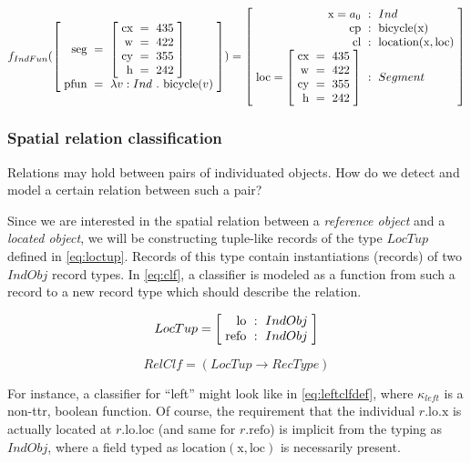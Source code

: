 \begin{equation}\label{eq:indfunrec}
f_{IndFun}(
\rec{
\text{seg} &=& \rec{
\text{cx} &=& 435\\
\text{w} &=& 422\\
\text{cy} &=& 355\\
\text{h} &=& 242
}\\
\text{pfun} &=& \lambda v:Ind\ .\ \text{bicycle}(v)\\
}
) =
\rec{
    \text{x} = a_0 &:& Ind \\
    \text{cp} &:& \text{bicycle}(\text{x}) \\
    \text{cl} &:& \text{location}(\text{x}, \text{loc}) \\
    \text{loc} = \rec{
        \text{cx} &=& 435\\
        \text{w} &=& 422\\
        \text{cy} &=& 355\\
        \text{h} &=& 242
		} &:& Segment\\
}
\end{equation}



\subsubsection{Spatial relation classification}

Relations may hold between pairs of individuated objects.
How do we detect and model a certain relation between such a pair?

Since we are interested in the spatial relation between a \textit{reference object} and a \textit{located object}, we will be constructing tuple-like records of the type $LocTup$ defined in \autoref{eq:loctup}.
Records of this type contain instantiations (records) of two $IndObj$ record types.
In \autoref{eq:clf}, a classifier is modeled as a function from such a record to a new record type which should describe the relation.

\begin{equation}\label{eq:loctup}
LocTup = \rec{
    \text{lo} &:& IndObj \\
    \text{refo} &:& IndObj \\
    }
\end{equation}

\begin{equation}\label{eq:clf}
RelClf = ( LocTup \rightarrow RecType )
\end{equation}

For instance, a classifier for ``left'' might look like in \autoref{eq:leftclfdef}, where $\kappa_{left}$ is a non-\gls{ttr}, boolean function.
Of course, the requirement that the individual $r.\text{lo}.\text{x}$ is actually located at $r.\text{lo}.\text{loc}$ (and same for $r.\text{refo}$) is implicit from the typing as $IndObj$, where a field typed as $\text{location}(\text{x}, \text{loc})$ is necessarily present.

